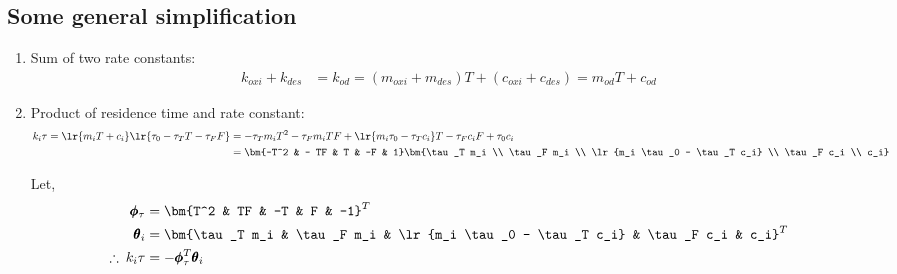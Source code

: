 \subsection{Some general simplification}
\begin{enumerate}
        \item Sum of two rate constants:
        \begin{align}
                k_{oxi} + k_{des} &= k_{od} = (m_{oxi} + m_{des}) T + (c_{oxi} + c_{des}) = m_{od} T + c_{od} \label{eqn::k_sum}
        \end{align}

        \item Product of residence time and rate constant:
        \begin{align*}
        k_i \tau  = \lr{m_i T + c_i} \lr{\tau_0 - \tau_T T - \tau_F F}
                  &= - \tau_T m_i T^2 - \tau_F m_i TF + \lr{m_i \tau_0 - \tau_T c_i} T - \tau_F c_i F + \tau_0 c_i \\
                  &= \bm{-T^2 & - TF & T & -F & 1} \bm{\tau_T m_i \\
                                                       \tau_F m_i \\
                                                       \lr{m_i \tau_0 - \tau_T c_i} \\
                                                       \tau_F c_i \\
                                                       c_i}
        \end{align*}

        Let,
        \begin{align}
                \pmb \phi_\tau &= \bm{T^2 & TF & -T & F & -1}^T  \label{eqn::phi_tau}\\
                \pmb \theta_i &= \bm{\tau_T m_i &
                                \tau_F m_i &
                                \lr{m_i \tau_0 - \tau_T c_i} &
                                \tau_F c_i &
                                c_i}^T          \label{eqn::theta_i}\\
                \therefore \: k_i \tau &= - \pmb \phi_\tau^T \pmb \theta_i   \label{eqn::tau_ki}
        \end{align}



\end{enumerate}
